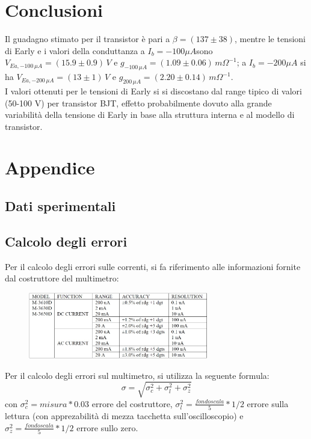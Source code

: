 \documentclass{article}
\begin{document}
\section{Conclusioni}
Il guadagno stimato per il transistor è pari a $\beta=(137\pm38)$, mentre le tensioni di Early e i valori della conduttanza a $I_b=-100 \mu A$sono $V_{Ea,-100 \,\mu A}=(15.9\pm 0.9) \,V$ e $g_{-100 \,\mu A}=(1.09 \pm 0.06) \,m\Omega^{-1} $; a $I_b=-200 \mu A$ si ha $V_{Ea,-200 \,\mu A}=(13\pm 1) \,V $ e $g_{200 \, \mu A}=(2.20 \pm 0.14) \,m\Omega^{-1}$.\\
I valori ottenuti per le tensioni di Early si si discostano dal range tipico di valori (50-100 V) per transistor BJT, effetto probabilmente dovuto alla grande variabilità della tensione di Early in base alla struttura interna e al modello di transistor.


\newpage
\section{Appendice}

\subsection{Dati sperimentali}


\subsection{Calcolo degli errori}
Per il calcolo degli errori sulle correnti, si fa riferimento alle informazioni fornite dal costruttore del multimetro:
\begin{figure}[H]
    \centering
    \includegraphics[width=0.7\textwidth]{Errore_multimetro.jpg}
\end{figure}
Per il calcolo degli errori sul multimetro, si utilizza la seguente formula:
\begin{equation}
    \sigma=\sqrt{\sigma_c^2+\sigma_l^2+\sigma_z^2}
\end{equation}
con $\sigma_c^2 = misura*0.03$ errore del costruttore, $\sigma_l^2= \frac{fondo scala}{5}*1/2$ errore sulla lettura (con apprezabilità di mezza tacchetta sull'oscilloscopio) e $\sigma_z^2= \frac{fondo scala}{5}*1/2$ errore sullo zero.
\end{document}
